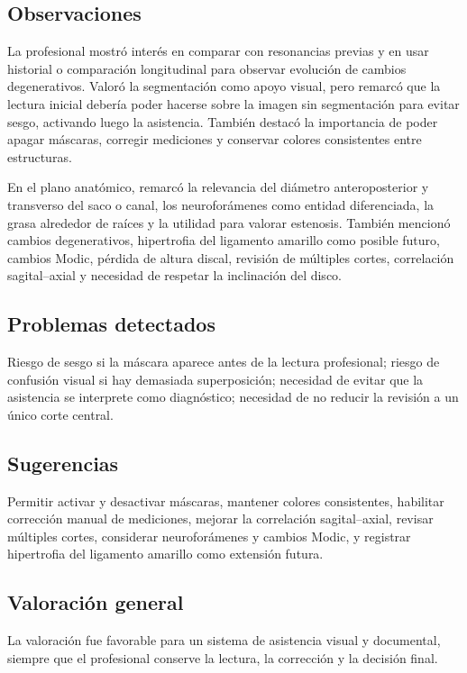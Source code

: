 \subsection*{Observaciones}
La profesional mostró interés en comparar con resonancias previas y en usar historial o comparación longitudinal para observar evolución de cambios degenerativos. Valoró la segmentación como apoyo visual, pero remarcó que la lectura inicial debería poder hacerse sobre la imagen sin segmentación para evitar sesgo, activando luego la asistencia. También destacó la importancia de poder apagar máscaras, corregir mediciones y conservar colores consistentes entre estructuras.

En el plano anatómico, remarcó la relevancia del diámetro anteroposterior y transverso del saco o canal, los neuroforámenes como entidad diferenciada, la grasa alrededor de raíces y la utilidad para valorar estenosis. También mencionó cambios degenerativos, hipertrofia del ligamento amarillo como posible futuro, cambios Modic, pérdida de altura discal, revisión de múltiples cortes, correlación sagital--axial y necesidad de respetar la inclinación del disco.

\subsection*{Problemas detectados}
Riesgo de sesgo si la máscara aparece antes de la lectura profesional; riesgo de confusión visual si hay demasiada superposición; necesidad de evitar que la asistencia se interprete como diagnóstico; necesidad de no reducir la revisión a un único corte central.

\subsection*{Sugerencias}
Permitir activar y desactivar máscaras, mantener colores consistentes, habilitar corrección manual de mediciones, mejorar la correlación sagital--axial, revisar múltiples cortes, considerar neuroforámenes y cambios Modic, y registrar hipertrofia del ligamento amarillo como extensión futura.

\subsection*{Valoración general}
La valoración fue favorable para un sistema de asistencia visual y documental, siempre que el profesional conserve la lectura, la corrección y la decisión final.

